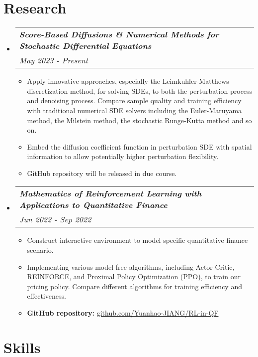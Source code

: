\documentclass[12pt, a4paper]{article}
\makeatletter
\newcommand{\resumeSection}[1]{
    \section*{#1}
}
\newcommand{\resumeResearchItm}[2]{
\item
    \begin{tabular*}{0.96\textwidth}{@{}l@{\extracolsep{\fill}}r@{}}
        \hspace{-1.5mm}\textit{\textbf{#1}} & \\
        \hspace{0.5mm}\textit{#2} &
    \end{tabular*}
}
\newcommand{\resumeSectionSubItm}[2]{
\item
    \textbf{\parbox[t]{4.7cm}{#1\hfill}}\parbox[t]{12.5cm}{#2}\vspace{-2mm}
}
\newcommand{\resumeSectionSubItmI}[1]{
\item {#1}\vspace{-2mm}
}
\newcommand{\resumeSectionSubItmII}[1]{\item \textbf{#1}}
\makeatother
\begin{document}
\resumeSection{Research}
\begin{itemize}[leftmargin=*]
    \resumeResearchItm{Score-Based Diffusions \& Numerical Methods for
    Stochastic Differential Equations}{May 2023 - Present}
    \vspace{-2mm}
    \begin{itemize}[leftmargin=*]
        \resumeSectionSubItmI{Apply innovative approaches, especially the
            Leimkuhler-Matthews discretization method, for solving SDEs, to both
            the perturbation process and denoising process. Compare sample
            quality and training efficiency with traditional numerical SDE
            solvers including the Euler-Maruyama method, the Milstein method,
        the stochastic Runge-Kutta method and so on.}
        \resumeSectionSubItmI{Embed the diffusion coefficient function in
            perturbation SDE with spatial information to allow potentially
        higher perturbation flexibility.}
        \resumeSectionSubItmI{GitHub repository will be released in due course.}
    \end{itemize}
    \vspace{1mm}
    \resumeResearchItm{
        Mathematics of Reinforcement Learning with Applications to
        Quantitative Finance
    }{Jun 2022 - Sep 2022}
    \vspace{-2mm}
    \begin{itemize}[leftmargin=*]
        \resumeSectionSubItmI{Construct interactive environment to model
        specific quantitative finance scenario.}
        \resumeSectionSubItmI{Implementing various model-free algorithms,
            including Actor-Critic, REINFORCE, and Proximal Policy Optimization
            (PPO), to train our pricing policy. Compare different algorithms for
        training efficiency and effectiveness.}
        \resumeSectionSubItmII{GitHub repository: }
        \href{https://github.com/Yuanhao-JIANG/RL-in-QF}{github.com/Yuanhao-JIANG/RL-in-QF}
    \end{itemize}
\end{itemize}
\vspace{-2mm}

\resumeSection{Skills}
\vspace{-1mm}
\end{document}
